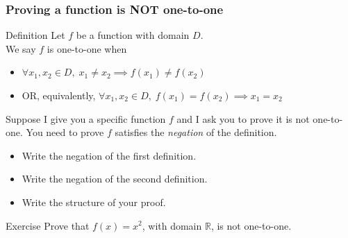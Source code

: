 \documentclass[14pt]{beamer}
\begin{document}
\begin{frame}[t]
	\fontsize{13}{13}\selectfont
	\frametitle{Proving a function is NOT one-to-one}

	\begin{block}{Definition}
		Let $f$ be a function with domain $D$. \\ We say $f$ is one-to-one when
		\begin{itemize}
			\item \hfill $\displaystyle \forall x_{1}, x_{2}\in D, \; x_{1}\neq x_{2}\implies
				f(x_{1}) \neq f(x_{2})$

			\item OR, equivalently, \hfill $\displaystyle \forall x_{1}, x_{2}\in D, \;
				f(x_{1}) = f(x_{2}) \implies x_{1}= x_{2}$
		\end{itemize}
	\end{block}

	\vfill

	Suppose I give you a specific function $f$ and I ask you to prove it is not one-to-one.
	You need to prove $f$ satisfies the \emph{negation} of the definition.
	\begin{itemize}
		\item Write the negation of the first definition.

		\item Write the negation of the second definition.

		\item Write the structure of your proof.
	\end{itemize}

	\vfill

	\begin{block}{Exercise}
		Prove that $f(x) = x^{2}$, with domain $\mathbb{R}$, is not one-to-one.
	\end{block}
\end{frame}
\end{document}
